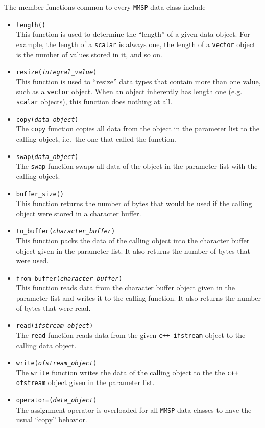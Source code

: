 The member functions common to every {\tt MMSP} data class include
\begin{itemize}
\item {\tt length()} \\
This function is used to determine the ``length'' of a given data object.  For example, the length of a {\tt scalar} is always one, the length of a {\tt vector} object is the number of values stored in it, and so on.

\item {\tt resize({\it integral\_value})} \\
This function is used to ``resize'' data types that contain more than one value, such as a {\tt vector} object.  When an object inherently has length one (e.g. {\tt scalar} objects), this function does nothing at all.

\item {\tt copy({\it data\_object})} \\
The {\tt copy} function copies all data from the object in the parameter list to the calling object, i.e.\ the one that called the function.

\item {\tt swap({\it data\_object})} \\
The {\tt swap} function swaps all data of the object in the parameter list with the calling object.

\item {\tt buffer\_size()} \\
This function returns the number of bytes that would be used if the calling object were stored in a character buffer.

\item {\tt to\_buffer({\it character\_buffer})} \\
This function packs the data of the calling object into the character buffer object given in the parameter list.  It also returns the number of bytes that were used.

\item {\tt from\_buffer({\it character\_buffer})} \\
This function reads data from the character buffer object given in the parameter list and writes it to the calling function.  It also returns the number of bytes that were read.

\item {\tt read({\it ifstream\_object})} \\
The {\tt read} function reads data from the given {\tt c++ ifstream} object to the calling data object.

\item {\tt write({\it ofstream\_object})} \\
The {\tt write} function writes the data of the calling object to the the {\tt c++ ofstream} object given in the parameter list.

\item {\tt operator=({\it data\_object})} \\
The assignment operator is overloaded for all {\tt MMSP} data classes to have the usual ``copy'' behavior.
\end{itemize}
